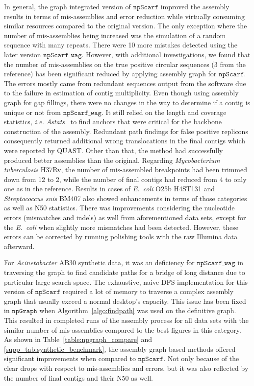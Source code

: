 \documentclass[10pt,twocolumn,twoside]{genpaper}
\newcommand{\npscarf}{$\mathtt{npScarf}$}
\newcommand{\npscarfg}{$\mathtt{npScarf\_wag}$}
\newcommand{\npgraph}{$\mathtt{npGraph}$}
\newcommand{\ec}{\emph{E.~coli}}
\newcommand{\IE}{\emph{i.e.}}
\begin{document}
In general, the graph integrated version of \npscarf{} improved the assembly results in terms of mis-assemblies and error reduction while virtually consuming similar resources compared to the original version.
The only exception where the number of mis-assemblies being increased was the simulation of a random sequence with many repeats. There were 10 more mistakes detected using the later version \npscarfg{}. However, with additional investigations, we found that the number of mis-assemblies on the true positive circular sequences (3 from the reference) has been significant reduced by applying assembly graph for \npscarf{}. The errors mostly came from redundant sequences output from the software due to the failure in estimation of contig multiplicity.
Even though using assembly graph for gap fillings, there were no changes in the way to determine if a contig is unique or not from \npscarfg{}. 
It still relied on the length and coverage statistics, \IE{} \emph{Astats}~\cite{MyersSD2000} to find anchors that were critical for the backbone construction of the assembly.
Redundant path findings for false positive replicons consequently returned additional wrong translocations in the final contigs which were reported by QUAST. 
Other than that, the method had successfully produced better assemblies than the original. Regarding \emph{Mycobacterium tuberculosis} H37Rv, the number of mis-assembled breakpoints had been trimmed down from 12 to 2, while the number of final contigs had reduced from 4 to only one as in the reference. Results in cases of \ec{} O25b H4ST131 and \emph{Streptococcus suis} BM407 also showed enhancements in terms of those categories as well as N50 statistics. 
There was improvements considering the nucleotide errors (mismatches and indels) as well from aforementioned data sets, except for the \ec{} when slightly more mismatches had been detected. However, these errors can be corrected by running polishing tools with the raw Illumina data afterward. 

For \emph{Acinetobacter} AB30 synthetic data, it was an deficiency for \npscarfg{} in traversing the graph to find candidate paths for a bridge of long distance due to particular large search space.
The exhaustive, naive DFS implementation for this version of \npscarf{} required a lot of memory to traverse a complex assembly graph that usually exceed a normal desktop's capacity.
This issue has been fixed in \npgraph{} when Algorithm~\ref{algo:findpath} was used on the definitive graph. This resulted in completed runs of the assembly process for all data sets with the similar number of mis-assemblies compared to the best figures in this category.
As shown in Table~\ref{table:npgraph_compare} and \ref{supp_tab:synthetic_benchmark}, the assembly graph based methods offered significant improvements when compared to \npscarf{}. Not only because of the clear drops with respect to mis-assemblies and errors, but it was also reflected by the number of final contigs and their N50 as well.
\end{document}
